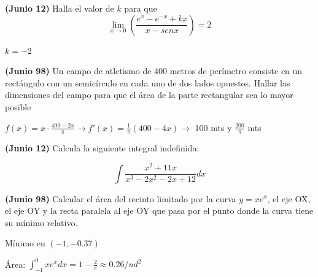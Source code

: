\documentclass[addpoints,spanish, 12pt,a4paper]{exam}
\begin{document}
\begin{questions}
\begin{parts}
\begin{solution}
\end{solution}
\end{parts}

\question[2] \textbf{(Junio 12)} Halla el valor de $k$ para que $$\lim_{x \to 0}\left(\frac{e^x-e^{-x}+kx}{x- sen{x}}\right)=2$$
\begin{solution}
$k=-2$
\end{solution}


\question[3] \textbf{(Junio 98)} Un campo de atletismo de 400 metros de perímetro consiste en un rectángulo con un semicírculo en cada uno de dos lados opuestos. Hallar las dimensiones del campo para que el área de la parte rectangular sea lo  mayor posible 
\begin{solution} $f(x)=x\cdot \frac{400 - 2x}{\pi} \to f'(x)=\frac{1}{\pi}(400-4x)\to $
100 mts y $\frac{200}{\pi}$ mts
\end{solution}

\question[3] \textbf{(Junio 12)} Calcula la siguiente integral indefinida:

$$\int \frac{x^2+11x}{x^3-2x^2-2x+12} dx$$

\question[2]  \textbf{(Junio 98)} Calcular el área del recinto limitado por la curva  $y = x e^x$, el eje OX, el eje OY y la recta paralela al eje OY que pasa por el punto donde la curva tiene su mínimo relativo.
\begin{solution}
Mínimo en $(-1 , -0.37)$

Área: $\int_{-1}^0 xe^xdx=1-\frac{2}{e}\approx 0.26 / ud^2$
\end{solution}

\addpoints



\end{questions}
\end{document}
